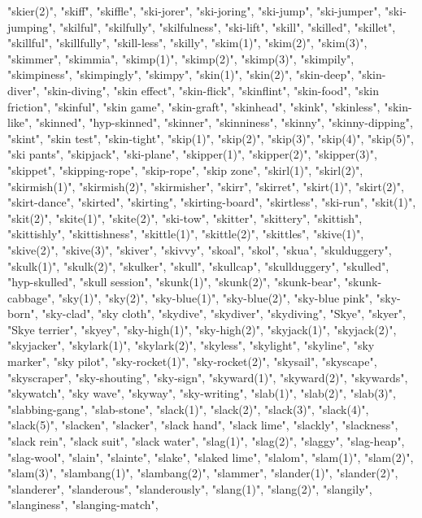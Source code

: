 "skier(2)",
"skiff",
"skiffle",
"ski-jorer",
"ski-joring",
"ski-jump",
"ski-jumper",
"ski-jumping",
"skilful",
"skilfully",
"skilfulness",
"ski-lift",
"skill",
"skilled",
"skillet",
"skillful",
"skillfully",
"skill-less",
"skilly",
"skim(1)",
"skim(2)",
"skim(3)",
"skimmer",
"skimmia",
"skimp(1)",
"skimp(2)",
"skimp(3)",
"skimpily",
"skimpiness",
"skimpingly",
"skimpy",
"skin(1)",
"skin(2)",
"skin-deep",
"skin-diver",
"skin-diving",
"skin effect",
"skin-flick",
"skinflint",
"skin-food",
"skin friction",
"skinful",
"skin game",
"skin-graft",
"skinhead",
"skink",
"skinless",
"skin-like",
"skinned",
"hyp-skinned",
"skinner",
"skinniness",
"skinny",
"skinny-dipping",
"skint",
"skin test",
"skin-tight",
"skip(1)",
"skip(2)",
"skip(3)",
"skip(4)",
"skip(5)",
"ski pants",
"skipjack",
"ski-plane",
"skipper(1)",
"skipper(2)",
"skipper(3)",
"skippet",
"skipping-rope",
"skip-rope",
"skip zone",
"skirl(1)",
"skirl(2)",
"skirmish(1)",
"skirmish(2)",
"skirmisher",
"skirr",
"skirret",
"skirt(1)",
"skirt(2)",
"skirt-dance",
"skirted",
"skirting",
"skirting-board",
"skirtless",
"ski-run",
"skit(1)",
"skit(2)",
"skite(1)",
"skite(2)",
"ski-tow",
"skitter",
"skittery",
"skittish",
"skittishly",
"skittishness",
"skittle(1)",
"skittle(2)",
"skittles",
"skive(1)",
"skive(2)",
"skive(3)",
"skiver",
"skivvy",
"skoal",
"skol",
"skua",
"skulduggery",
"skulk(1)",
"skulk(2)",
"skulker",
"skull",
"skullcap",
"skullduggery",
"skulled",
"hyp-skulled",
"skull session",
"skunk(1)",
"skunk(2)",
"skunk-bear",
"skunk-cabbage",
"sky(1)",
"sky(2)",
"sky-blue(1)",
"sky-blue(2)",
"sky-blue pink",
"sky-born",
"sky-clad",
"sky cloth",
"skydive",
"skydiver",
"skydiving",
"Skye",
"skyer",
"Skye terrier",
"skyey",
"sky-high(1)",
"sky-high(2)",
"skyjack(1)",
"skyjack(2)",
"skyjacker",
"skylark(1)",
"skylark(2)",
"skyless",
"skylight",
"skyline",
"sky marker",
"sky pilot",
"sky-rocket(1)",
"sky-rocket(2)",
"skysail",
"skyscape",
"skyscraper",
"sky-shouting",
"sky-sign",
"skyward(1)",
"skyward(2)",
"skywards",
"skywatch",
"sky wave",
"skyway",
"sky-writing",
"slab(1)",
"slab(2)",
"slab(3)",
"slabbing-gang",
"slab-stone",
"slack(1)",
"slack(2)",
"slack(3)",
"slack(4)",
"slack(5)",
"slacken",
"slacker",
"slack hand",
"slack lime",
"slackly",
"slackness",
"slack rein",
"slack suit",
"slack water",
"slag(1)",
"slag(2)",
"slaggy",
"slag-heap",
"slag-wool",
"slain",
"slainte",
"slake",
"slaked lime",
"slalom",
"slam(1)",
"slam(2)",
"slam(3)",
"slambang(1)",
"slambang(2)",
"slammer",
"slander(1)",
"slander(2)",
"slanderer",
"slanderous",
"slanderously",
"slang(1)",
"slang(2)",
"slangily",
"slanginess",
"slanging-match",
